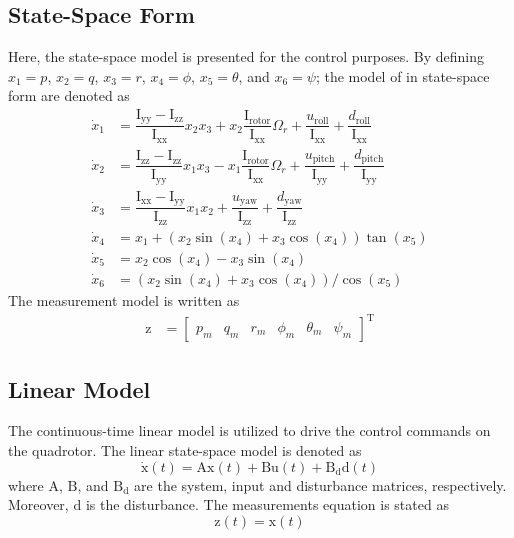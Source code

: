 \documentclass[conference]{IEEEtran}
\begin{document}
\subsection{State-Space Form}
\noindent Here, the state-space model is presented for the control purposes.
By defining $x_1 = p$, $x_2 = q$, $x_3 = r$, $x_4 = \phi$, $x_5 = \theta$, and $x_6 = \psi$; the model of in state-space form are denoted as
\begin{align}\label{eq:diffeq}
		\dot x_1 &= \dfrac{\mathrm{I}_{\text{yy}} - \mathrm{I}_{\text{zz}}}{\mathrm{I}_{\text{xx}}} x_2 x_3 + x_2 \dfrac{\mathrm{I}_{\text{rotor}}}{\mathrm{I}_{\text{xx}}}\Omega_r + \dfrac{u_{\text{roll}}}{\mathrm{I}_{\text{xx}}} + \dfrac{d_{\text{roll}}}{\mathrm{I}_{\text{xx}}} \\
	\dot x_2 &= \dfrac{\mathrm{I}_{\text{zz}} - \mathrm{I}_{\text{zz}}}{\mathrm{I}_{\text{yy}}} x_1 x_3 - x_1 \dfrac{\mathrm{I}_{\text{rotor}}}{\mathrm{I}_{\text{xx}}}\Omega_r + \dfrac{u_{\text{pitch}}}{\mathrm{I}_{\text{yy}}} + \dfrac{d_{\text{pitch}}}{\mathrm{I}_{\text{yy}}}\\
	\dot x_3 &= \dfrac{\mathrm{I}_{\text{xx}} - \mathrm{I}_{\text{yy}}}{\mathrm{I}_{\text{zz}}} x_1 x_2 + \dfrac{u_{\text{yaw}}}{\mathrm{I}_{\text{zz}}} + \dfrac{d_{\text{yaw}}}{\mathrm{I}_{\text{zz}}}\\	
	\dot x_4 &= x_1 + (x_2\sin(x_4) + x_3\cos(x_4))\tan(x_5)
\\
	\dot x_5 &= x_2\cos(x_4) - x_3\sin(x_4)\\
	\dot x_6 &= (x_2\sin(x_4) + x_3\cos(x_4))/\cos(x_5) \label{eq:diffeq-end}
\end{align}
The measurement model is written as
\begin{equation}
	\begin{split}
		\boldsymbol{\mathrm{z}} &= \begin{bmatrix}
			p_m & q_m & r_m & \phi_m & \theta_m & \psi_m
		\end{bmatrix}^\mathrm{T}
	\end{split}
\end{equation}

\subsection{Linear Model}
\noindent The continuous-time linear model is utilized to drive the control commands on the quadrotor. The linear state-space model is denoted as
\begin{equation}\label{eq:linear}
	\boldsymbol{\dot{\mathrm{x}}}(t) = \boldsymbol{\mathrm{Ax}}(t) + \boldsymbol{\mathrm{Bu}}(t) + \boldsymbol{\mathrm{B_{d}d}}(t)
\end{equation}
where $\boldsymbol{\mathrm{A}}$, $\boldsymbol{\mathrm{B}}$, and $\boldsymbol{\mathrm{B_d}}$ are the system, input and disturbance matrices, respectively. Moreover, $\boldsymbol{\mathrm{d}}$ is the disturbance. The measurements equation is stated as
\begin{equation}
	\boldsymbol{{\mathrm{z}}}(t) = \boldsymbol{\mathrm{x}}(t)
\end{equation}
\end{document}
